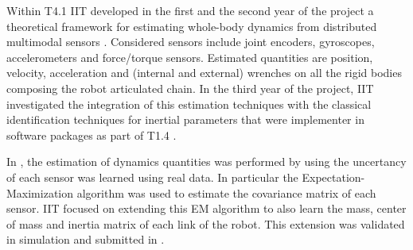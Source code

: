 
Within T4.1 IIT developed in the first and the second year of the 
project a theoretical framework for estimating whole-body
dynamics from distributed multimodal sensors \cite{nori2015}. Considered sensors
include joint encoders, gyroscopes, accelerometers and force/torque sensors.
Estimated quantities are position, velocity, acceleration and (internal and
external) wrenches on all the rigid bodies composing the robot articulated
chain. In the third year of the project, IIT investigated the integration
of this estimation techniques with the classical identification techniques
for inertial parameters that were implementer in software packages as part of T1.4 .

In \cite{nori2015}, the estimation of dynamics quantities was performed by using 
the uncertancy of each sensor  was learned using real data.
In particular the Expectation-Maximization algorithm was used to estimate the covariance matrix of 
each sensor. IIT focused on extending this EM algorithm to also learn the mass,
center of mass and inertia matrix of each link of the robot.
This extension was validated in simulation and submitted in \cite{traversaro2015parametersEM}. 
 

